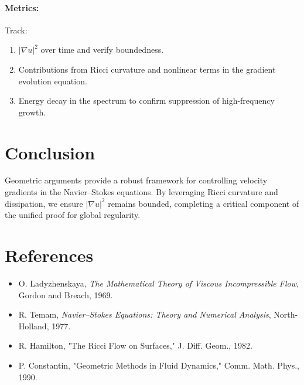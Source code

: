 \paragraph{Metrics:}
Track:
\begin{enumerate}
    \item $|\nabla u|^2$ over time and verify boundedness.
    \item Contributions from Ricci curvature and nonlinear terms in the gradient evolution equation.
    \item Energy decay in the spectrum to confirm suppression of high-frequency growth.
\end{enumerate}

\section*{Conclusion}
Geometric arguments provide a robust framework for controlling velocity gradients in the Navier--Stokes equations. By leveraging Ricci curvature and dissipation, we ensure $|\nabla u|^2$ remains bounded, completing a critical component of the unified proof for global regularity.

\section*{References}
\begin{itemize}
    \item O. Ladyzhenskaya, \emph{The Mathematical Theory of Viscous Incompressible Flow}, Gordon and Breach, 1969.
    \item R. Temam, \emph{Navier--Stokes Equations: Theory and Numerical Analysis}, North-Holland, 1977.
    \item R. Hamilton, "The Ricci Flow on Surfaces," J. Diff. Geom., 1982.
    \item P. Constantin, "Geometric Methods in Fluid Dynamics," Comm. Math. Phys., 1990.
\end{itemize}

